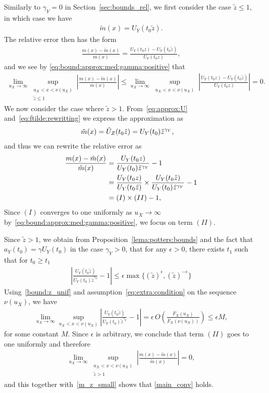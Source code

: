 \documentclass{statsoc}
\theoremstyle{break}
\newcommand{\tzero}{t_0}
\newcommand{\beam}{\begin{eqnarray}}
\newcommand{\eeam}{\end{eqnarray}\noindent}
\begin{document}
Similarly to $\gamma_Y = 0$ in Section~\ref{sec:bounds_rel}, we first consider the case $\tilde z \leq 1$, in which case we have 
\begin{align*}
	\tilde m(x) = U_Y(\tzero \tilde z).
\end{align*}
The relative error then has the form 
\begin{align*}
	\frac{m(x) - \tilde m(x)}{ m(x)} = \frac{U_Y(\tzero z) - U_Y(\tzero \tilde z)}{ U_Y(\tzero z)},
\end{align*}
and we see by \eqref{eq:bound:approx:med:gamma:positive} that
\begin{align}\label{m_z_small}
	\lim_{u_X\to\infty} \sup_{ \substack{ u_X < x < \nu(u_X) \\ \tilde z \leq 1 } } \left| \frac{m(x) - \tilde m(x)}{ m(x)} \right| \leq  	\lim_{u_X\to\infty} \sup_{ \substack{ u_X < x < \nu(u_X) } } \left|  \frac{U_Y(\tzero z) - U_Y(\tzero \tilde z)}{ U_Y(\tzero z)} \right| = 0. 
\end{align}
We now consider the case where $\tilde z > 1$. 
From~\eqref{eq:approx:U} and~\eqref{eq:ftilde:rewritting} we express the approximation as 
\begin{align*}
	\notag\tilde m(x) &= \tilde U_Z(t_0 \tilde z )= U_Y(\tzero) \tilde z^{\gamma_Y},
\end{align*}
and thus we can rewrite the relative error as 
\begin{align}
	\notag \frac{m(x) - \tilde m(x)}{\tilde m(x)}& = \frac{U_Y(\tzero z)}{ U_Y(\tzero)\tilde z^{\gamma_Y}} - 1\\
	\notag & = \frac{U_Y(t_0 z) }{U_Y(t_0 \tilde z)} \times \frac{U_Y(\tzero \tilde z)}{ U_Y(\tzero)\tilde z^{\gamma_Y}}  - 1\\
	\label{error_decomp}& = (I) \times (II) -1,
\end{align}
Since $(I)$ converges to one uniformly as $u_X \to \infty$ by~\eqref{eq:bound:approx:med:gamma:positive}, we focus on term $(II)$.


Since $\tilde z > 1$, we obtain from Proposition~\ref{lema:potters:bounds} and the fact that $a_Y(t_0) = \gamma U_Y(t_0)$ in the case $\gamma_Y>0$, that for any $\epsilon > 0$, there exists $t_1$ such that for $t_0 \geq t_1$
\begin{align*} 
	 \left| \frac{U_Y(t_0 \tilde z)}{U_Y(t_0) \tilde z^{\gamma_Y}} - 1 \right|  \leq \epsilon \max\{(\tilde z)^{\epsilon}, (\tilde z)^{-\epsilon}\} 
\end{align*} 
Using~\eqref{bound:z_unif} and assumption~\eqref{eq:extra:condition} on the sequence $\nu(u_X)$, we have
\begin{align*} 
	\lim_{u_X \to \infty}\sup_{u_X < x < \nu(u_X) } 	\left| \frac{U_Y(t_0 \tilde z)}{U_Y(t_0) \tilde z^{\gamma_Y}} - 1 \right|  = \epsilon  \, O\left( \frac{\bar F_X(u_X)}{\bar F_X(\nu(u_X))}\right) \leq \epsilon M,
\end{align*} 
for some constant $M$. Since $\epsilon$ is arbitrary, we conclude that term $(II)$ goes to one uniformly and therefore
\beam\label{eq:res} 
\lim_{u_X \to \infty}	\sup_{ \substack{ u_X < x < \nu(u_X) \\ \tilde z > 1 } }  \left|\frac{m(x) - \tilde m(x)}{\tilde m(x)}\right| = 0,
\eeam 
and this together with~\eqref{m_z_small} shows that \eqref{main_conv} holds.
\end{document}
